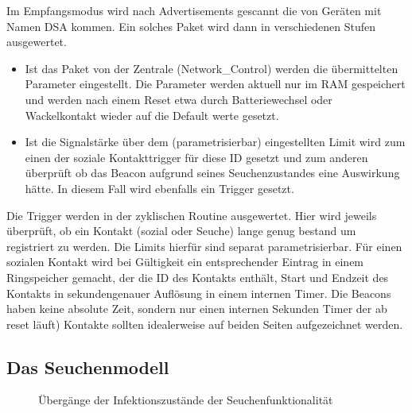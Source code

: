 \documentclass[11pt,ngerman]{scrartcl} %
\begin{document}
Im Empfangsmodus wird nach Advertisements gescannt die von Geräten mit Namen DSA kommen. Ein solches Paket wird dann in verschiedenen Stufen ausgewertet.
\begin{itemize}
\item Ist das Paket von der Zentrale (Network\_Control) werden die übermittelten Parameter eingestellt. Die Parameter werden aktuell nur im RAM gespeichert und werden nach einem Reset etwa durch Batteriewechsel oder Wackelkontakt wieder auf die Default werte gesetzt. 
\item Ist die Signalstärke über dem (parametrisierbar) eingestellten Limit wird zum einen der soziale Kontakttrigger für diese ID gesetzt und zum anderen überprüft ob das Beacon aufgrund seines Seuchenzustandes eine Auswirkung hätte. In diesem Fall wird ebenfalls ein Trigger gesetzt.
\end{itemize}
Die Trigger werden in der zyklischen Routine ausgewertet. Hier wird jeweils überprüft, ob ein Kontakt (sozial oder Seuche) lange genug bestand um registriert zu werden. Die Limits hierfür sind separat parametrisierbar. Für einen sozialen Kontakt wird bei Gültigkeit ein entsprechender Eintrag in einem Ringspeicher gemacht, der die ID des Kontakts enthält, Start und Endzeit des Kontakts in sekundengenauer Auflösung in einem internen Timer. Die Beacons haben keine absolute Zeit, sondern nur einen internen Sekunden Timer der ab reset läuft) Kontakte sollten idealerweise auf beiden Seiten aufgezeichnet werden.

\subsection{Das Seuchenmodell}

\begin{figure}[h]
\centering
{}
\caption{Übergänge der Infektionszustände der Seuchenfunktionalität}
   \label{fig:statemachine}
\end{figure}
\end{document}
